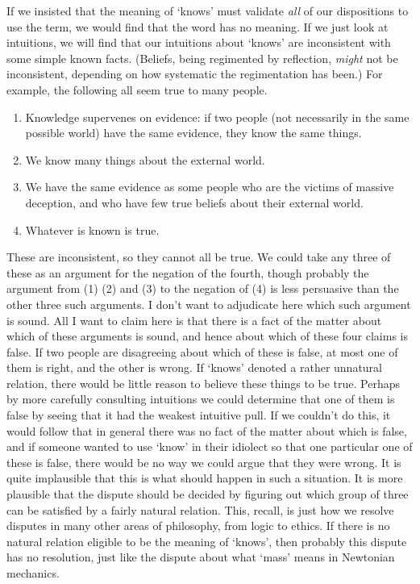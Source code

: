\documentclass[
  11pt,
  letterpaper,
  DIV=11,
  numbers=noendperiod,
  oneside]{scrartcl}
\begin{document}
If we insisted that the meaning of `knows' must validate \emph{all} of
our dispositions to use the term, we would find that the word has no
meaning. If we just look at intuitions, we will find that our intuitions
about `knows' are inconsistent with some simple known facts. (Beliefs,
being regimented by reflection, \emph{might} not be inconsistent,
depending on how systematic the regimentation has been.) For example,
the following all seem true to many people.

\begin{enumerate}
\def\labelenumi{\arabic{enumi}.}
\item
  Knowledge supervenes on evidence: if two people (not necessarily in
  the same possible world) have the same evidence, they know the same
  things.
\item
  We know many things about the external world.
\item
  We have the same evidence as some people who are the victims of
  massive deception, and who have few true beliefs about their external
  world.
\item
  Whatever is known is true.
\end{enumerate}

These are inconsistent, so they cannot all be true. We could take any
three of these as an argument for the negation of the fourth, though
probably the argument from (1) (2) and (3) to the negation of (4) is
less persuasive than the other three such arguments. I don't want to
adjudicate here which such argument is sound. All I want to claim here
is that there is a fact of the matter about which of these arguments is
sound, and hence about which of these four claims is false. If two
people are disagreeing about which of these is false, at most one of
them is right, and the other is wrong. If `knows' denoted a rather
unnatural relation, there would be little reason to believe these things
to be true. Perhaps by more carefully consulting intuitions we could
determine that one of them is false by seeing that it had the weakest
intuitive pull. If we couldn't do this, it would follow that in general
there was no fact of the matter about which is false, and if someone
wanted to use `know' in their idiolect so that one particular one of
these is false, there would be no way we could argue that they were
wrong. It is quite implausible that this is what should happen in such a
situation. It is more plausible that the dispute should be decided by
figuring out which group of three can be satisfied by a fairly natural
relation. This, recall, is just how we resolve disputes in many other
areas of philosophy, from logic to ethics. If there is no natural
relation eligible to be the meaning of `knows', then probably this
dispute has no resolution, just like the dispute about what `mass' means
in Newtonian mechanics.
\end{document}
